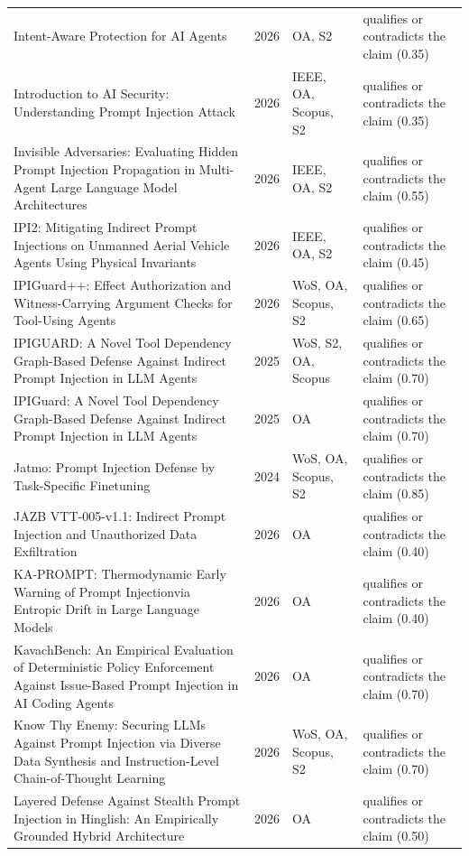 \begin{longtable}{@{}%
  >{\raggedright\arraybackslash}p{}c%
  >{\raggedright\arraybackslash}p{}%
  >{\raggedright\arraybackslash}p{}@{}}
Intent-Aware Protection for AI Agents & 2026 & OA, S2 & qualifies or contradicts the claim (0.35) \\
Introduction to AI Security: Understanding Prompt Injection Attack & 2026 & IEEE, OA, Scopus, S2 & qualifies or contradicts the claim (0.35) \\
Invisible Adversaries: Evaluating Hidden Prompt Injection Propagation in Multi-Agent Large Language Model Architectures & 2026 & IEEE, OA, S2 & qualifies or contradicts the claim (0.55) \\
IPI2: Mitigating Indirect Prompt Injections on Unmanned Aerial Vehicle Agents Using Physical Invariants & 2026 & IEEE, OA, S2 & qualifies or contradicts the claim (0.45) \\
IPIGuard++: Effect Authorization and Witness-Carrying Argument Checks for Tool-Using Agents & 2026 & WoS, OA, Scopus, S2 & qualifies or contradicts the claim (0.65) \\
IPIGUARD: A Novel Tool Dependency Graph-Based Defense Against Indirect Prompt Injection in LLM Agents & 2025 & WoS, S2, OA, Scopus & qualifies or contradicts the claim (0.70) \\
IPIGuard: A Novel Tool Dependency Graph-Based Defense Against Indirect Prompt Injection in LLM Agents & 2025 & OA & qualifies or contradicts the claim (0.70) \\
Jatmo: Prompt Injection Defense by Task-Specific Finetuning & 2024 & WoS, OA, Scopus, S2 & qualifies or contradicts the claim (0.85) \\
JAZB VTT-005-v1.1: Indirect Prompt Injection and Unauthorized Data Exfiltration & 2026 & OA & qualifies or contradicts the claim (0.40) \\
KA-PROMPT: Thermodynamic Early Warning of Prompt Injectionvia Entropic Drift in Large Language Models & 2026 & OA & qualifies or contradicts the claim (0.40) \\
KavachBench: An Empirical Evaluation of Deterministic Policy Enforcement Against Issue-Based Prompt Injection in AI Coding Agents & 2026 & OA & qualifies or contradicts the claim (0.70) \\
Know Thy Enemy: Securing LLMs Against Prompt Injection via Diverse Data Synthesis and Instruction-Level Chain-of-Thought Learning & 2026 & WoS, OA, Scopus, S2 & qualifies or contradicts the claim (0.70) \\
Layered Defense Against Stealth Prompt Injection in Hinglish: An Empirically Grounded Hybrid Architecture & 2026 & OA & qualifies or contradicts the claim (0.50) \\

\end{longtable}
